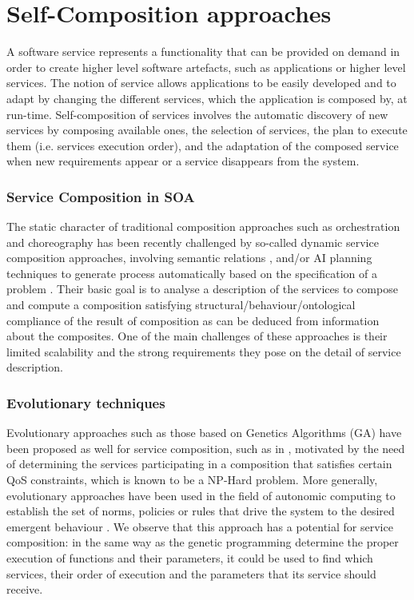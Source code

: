 \documentclass[12pt,a4paper,twoside,openright]{book}
\begin{document}
\section{Self-Composition approaches}
A software service represents a functionality that can be provided on demand in order to create higher level software artefacts, such as applications or higher level services.
%
The notion of service allows applications to be easily developed and to adapt by changing the different services, which the application is composed by, at run-time. 
%
Self-composition of services involves the automatic discovery of new services by composing available ones, the selection of services, the plan to execute them (i.e. services execution order), and the adaptation of the composed service when new requirements appear or a service disappears from the system.

\subsubsection{Service Composition in SOA}
The static character of traditional composition approaches such as orchestration and choreography has been recently challenged by so-called dynamic service composition approaches, involving semantic relations \cite{terBeek:06:ASSCFISFM}, and/or AI planning techniques to generate process automatically based on the specification of a problem \cite{wu2007automatic}. 
%
Their basic goal is to analyse a description of the services to compose and compute a composition satisfying structural/behaviour/ontological compliance of the result of composition as can be deduced from information about the composites.
%
One of the main challenges of these approaches is their limited scalability and the strong requirements they pose on the detail of service description.

\subsubsection{Evolutionary techniques}
Evolutionary approaches such as those based on Genetics Algorithms (GA) have been proposed as well for service composition, such as in \cite{Canfora2005}, motivated by the need of determining the services participating in a composition that satisfies certain QoS constraints, which is known to be a NP-Hard problem.
%
More generally, evolutionary approaches have been used in the field of autonomic computing to establish the set of norms, policies or rules that drive the system to the desired emergent behaviour \cite{Norman2010}.
%
We observe that this approach has a potential for service composition: in the same way as the genetic programming determine the proper execution of functions and their parameters, it could be used to find which services, their order of execution and the parameters that its service should receive. 
\end{document}
